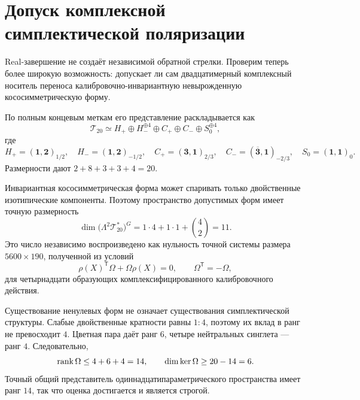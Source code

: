 \chapter{Допуск комплексной симплектической поляризации}
\label{ch:v8-horizontal-phase-complex-symplectic-polarization-admission-gate}

Real-завершение не создаёт независимой обратной стрелки. Проверим теперь
более широкую возможность: допускает ли сам двадцатимерный комплексный
носитель переноса калибровочно-инвариантную невырожденную кососимметрическую
форму.

По полным концевым меткам его представление раскладывается как
\begin{equation}
 \mathcal T_{20}
 \simeq H_+\oplus H_-^{\oplus4}
 \oplus C_+\oplus C_-\oplus S_0^{\oplus4},
 \label{eq:v8-symplectic-transfer-decomposition}
\end{equation}
где
\begin{equation}
 H_+=(\mathbf1,\mathbf2)_{1/2},\quad
 H_-=(\mathbf1,\mathbf2)_{-1/2},\quad
 C_+=(\mathbf3,\mathbf1)_{2/3},\quad
 C_-=(\overline{\mathbf3},\mathbf1)_{-2/3},\quad
 S_0=(\mathbf1,\mathbf1)_0.
 \label{eq:v8-symplectic-transfer-irreps}
\end{equation}
Размерности дают $2+8+3+3+4=20$.

Инвариантная кососимметрическая форма может спаривать только двойственные
изотипические компоненты. Поэтому пространство допустимых форм имеет
точную размерность
\begin{equation}
 \dim\bigl(\Lambda^2\mathcal T_{20}^*\bigr)^G
 =1\cdot4+1\cdot1+\binom42=11.
 \label{eq:v8-symplectic-invariant-form-dimension}
\end{equation}
Это число независимо воспроизведено как нульность точной системы размера
$5600\times190$, полученной из условий
\begin{equation}
 \rho(X)^{\mathsf T}\Omega+\Omega\rho(X)=0,
 \qquad \Omega^{\mathsf T}=-\Omega,
 \label{eq:v8-symplectic-invariance-system}
\end{equation}
для четырнадцати образующих комплексифицированного калибровочного действия.

Существование ненулевых форм не означает существования симплектической
структуры. Слабые двойственные кратности равны $1:4$, поэтому их вклад в
ранг не превосходит $4$. Цветная пара даёт ранг $6$, четыре нейтральных
синглета --- ранг $4$. Следовательно,
\begin{equation}
 \operatorname{rank}\Omega\leq4+6+4=14,
 \qquad
 \dim\ker\Omega\geq20-14=6.
 \label{eq:v8-symplectic-rank-radical-bound}
\end{equation}
Точный общий представитель одиннадцатипараметрического пространства имеет
ранг $14$, так что оценка достигается и является строгой.

